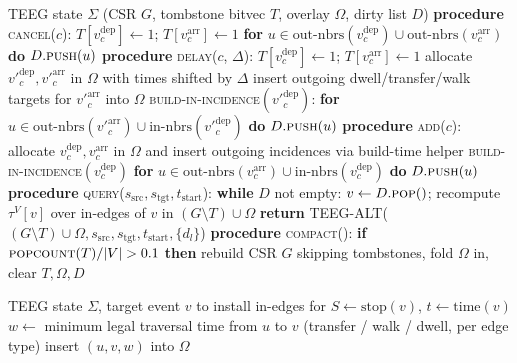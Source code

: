\documentclass[letterpaper]{article}
\begin{document}
\begin{algorithm}[H]
\caption{TEEG-INCR \textsc{cancel}/\textsc{delay}/\textsc{add}/\textsc{query}/\textsc{compact}}
\label{alg:teeg-incr}
\begin{algorithmic}[1]
\REQUIRE TEEG state $\Sigma$ (CSR $G$, tombstone bitvec $T$, overlay $\Omega$, dirty list $D$)
\STATE \textbf{procedure} \textsc{cancel}($c$):
\STATE \quad $T[v^\text{dep}_c] \gets 1$; $T[v^\text{arr}_c] \gets 1$
\STATE \quad \textbf{for} $u \in \text{out-nbrs}(v^\text{dep}_c) \cup \text{out-nbrs}(v^\text{arr}_c)$ \textbf{do} $D.\textsc{push}(u)$
\STATE \textbf{procedure} \textsc{delay}($c$, $\Delta$):
\STATE \quad $T[v^\text{dep}_c] \gets 1$; $T[v^\text{arr}_c] \gets 1$
\STATE \quad allocate ${v'}^\text{dep}_c, {v'}^\text{arr}_c$ in $\Omega$ with times shifted by $\Delta$
\STATE \quad insert outgoing dwell/transfer/walk targets for ${v'}^\text{arr}_c$ into $\Omega$
\STATE \quad \textsc{build-in-incidence}$({v'}^\text{dep}_c)$: 
\STATE \quad \textbf{for} $u \in \text{out-nbrs}({v'}^\text{arr}_c) \cup \text{in-nbrs}({v'}^\text{dep}_c)$ \textbf{do} $D.\textsc{push}(u)$
\STATE \textbf{procedure} \textsc{add}($c$):
\STATE \quad allocate $v^\text{dep}_c, v^\text{arr}_c$ in $\Omega$ and insert outgoing incidences via build-time helper
\STATE \quad \textsc{build-in-incidence}$(v^\text{dep}_c)$
\STATE \quad \textbf{for} $u \in \text{out-nbrs}(v^\text{arr}_c) \cup \text{in-nbrs}(v^\text{dep}_c)$ \textbf{do} $D.\textsc{push}(u)$
\STATE \textbf{procedure} \textsc{query}($s_\text{src}, s_\text{tgt}, t_\text{start}$):
\STATE \quad \textbf{while} $D$ not empty: $v \gets D.\textsc{pop}()$; recompute $\tau^V[v]$ over in-edges of $v$ in $(G \setminus T) \cup \Omega$
\STATE \quad \textbf{return} \textsc{TEEG-ALT}($(G \setminus T) \cup \Omega, s_\text{src}, s_\text{tgt}, t_\text{start}, \{d_l\}$)
\STATE \textbf{procedure} \textsc{compact}():
\STATE \quad \textbf{if} $\textsc{popcount}(T)/|V| > 0.1$ \textbf{then} rebuild CSR $G$ skipping tombstones, fold $\Omega$ in, clear $T, \Omega, D$
\end{algorithmic}
\end{algorithm}

\begin{algorithm}[H]
\caption{\textsc{build-in-incidence} helper used by Algorithm~2}
\label{alg:build-in-incidence}
\begin{algorithmic}[1]
\REQUIRE TEEG state $\Sigma$, target event $v$ to install in-edges for
\STATE $S \gets \text{stop}(v)$, $t \gets \text{time}(v)$
  \STATE $w \gets$ minimum legal traversal time from $u$ to $v$ (transfer / walk / dwell, per edge type)
    \STATE insert $(u, v, w)$ into $\Omega$
  \ENDIF
\ENDFOR
\end{algorithmic}
\end{algorithm}
\end{document}
